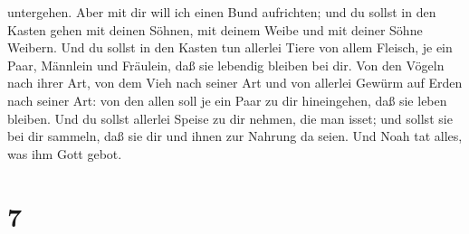 untergehen.  Aber mit dir will ich einen Bund aufrichten;
und du sollst in den Kasten gehen mit deinen Söhnen, mit deinem Weibe
und mit deiner Söhne Weibern.  Und du sollst in den Kasten
tun allerlei Tiere von allem Fleisch, je ein Paar, Männlein und
Fräulein, daß sie lebendig bleiben bei dir.  Von den Vögeln
nach ihrer Art, von dem Vieh nach seiner Art und von allerlei Gewürm auf
Erden nach seiner Art: von den allen soll je ein Paar zu dir
hineingehen, daß sie leben bleiben.  Und du sollst allerlei
Speise zu dir nehmen, die man isset; und sollst sie bei dir sammeln, daß
sie dir und ihnen zur Nahrung da seien.  Und Noah tat
alles, was ihm Gott gebot.

\hypertarget{section-6}{%
\section{7}\label{section-6}}


